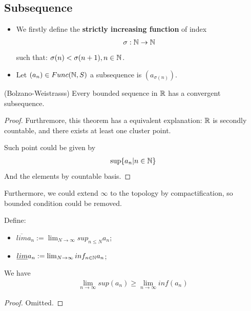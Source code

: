 \documentclass[Total.tex]{subfiles}
\begin{document}
				\subsection{Subsequence}
			
			\begin{Def}
				\begin{itemize}
					\item We firstly define the \textbf{strictly increasing function} of index
					\begin{gather*}
						\sigma:\mathbb{N}\rightarrow \mathbb{N}
					\end{gather*}
					such that: $\sigma(n)<\sigma(n+1),n\in \mathbb{N}$.
					\item Let $(a_n)\in Func(\mathbb{N},S)$ a subsequence is $(a_{\sigma(n)})$. 
				\end{itemize}
			\end{Def}
			
			\begin{theorem}
				(Bolzano-Weistrasss) Every bounded sequence in $\mathbb{R}$ has a convergent subsequence.  
			\end{theorem}
			\begin{proof}
				Furthremore, this theorem has a equivalent explanation: $\mathbb{R}$ is secondly countable, and there exists at least one cluster point. 
				
				Such point could be given by 
				\begin{gather*}
					\sup\{a_n|n\in \mathbb{N}\}
				\end{gather*}
				And the elements by countable basis.
			\end{proof}
			
			Furthermore, we could extend $\infty$ to the topology by compactification, so bounded condition could be removed.
			
			\begin{Def}
				Define:
				\begin{itemize}
					\item $\overline{lim} a_n:=\lim_{N\rightarrow \infty} sup_{n\leq N} a_n$;
					\item $\underline{lim} a_n:=\lim_{N\rightarrow \infty} inf_{n\in \mathbb{N}} a_n$;
				\end{itemize}
			\end{Def}
			
			\begin{proposition}
				We have
				\begin{gather*}
					\lim_{n\rightarrow \infty} sup(a_n)\geq \lim_{n\rightarrow \infty} inf(a_n)
				\end{gather*}
			\end{proposition}
			\begin{proof}
				Omitted.
			\end{proof}
			
\end{document}
